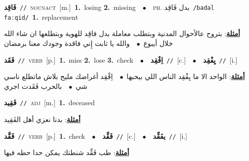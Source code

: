 \documentclass[10pt,a4paper,twoside]{article} %
\begin{document}
\begin{multicols}{2}
{\setlength\topsep{0pt}\textbf{\foreignlanguage{arabic}{فَاقِد}}\ {\color{gray}\texttt{//}\color{black}}\ \textsc{noun\textunderscore act}\ [m.]\ \textbf{1.}~losing  \textbf{2.}~missing\ \ $\bullet$\ \ \textsc{ph.} \color{gray} \foreignlanguage{arabic}{بدل فَاقِد}\color{black}\ {\color{gray}\texttt{/{\sffamily badal faːqid}/}\color{black}}\ \textbf{1.}~replacement\  \begin{flushright}\color{gray}\foreignlanguage{arabic}{\textbf{\underline{\foreignlanguage{arabic}{أمثلة}}}: بتروح عالأحوال المدنية وبتطلب معاملة بدل فاقِد للهوية وبتطلعها ان شاء الله خلال أيبوع\ $\bullet$\ \  والله يا ثابت إِني فاقدة وجودك معنا برمضان}\end{flushright}\color{black}} \vspace{2mm}

{\setlength\topsep{0pt}\textbf{\foreignlanguage{arabic}{فَقَد}}\ {\color{gray}\texttt{//}\color{black}}\ \textsc{verb}\ [p.]\ \textbf{1.}~miss  \textbf{2.}~lose  \textbf{3.}~check\ \ $\bullet$\ \ \setlength\topsep{0pt}\textbf{\foreignlanguage{arabic}{اِفْقِد}}\ {\color{gray}\texttt{//}\color{black}}\ [c.]\ \ $\bullet$\ \ \setlength\topsep{0pt}\textbf{\foreignlanguage{arabic}{يِفْقِد}}\ {\color{gray}\texttt{//}\color{black}}\ [i.]\  \begin{flushright}\color{gray}\foreignlanguage{arabic}{\textbf{\underline{\foreignlanguage{arabic}{أمثلة}}}: الواحد الا ما يِفْقِد الناس اللي بيحبها\ $\bullet$\ \  اِفْقِد أغراضك مليح بلاش ماتطلع ناسي شي\ $\bullet$\ \  بالحرب فَقَدت اجري}\end{flushright}\color{black}} \vspace{2mm}

{\setlength\topsep{0pt}\textbf{\foreignlanguage{arabic}{فَقِيد}}\ {\color{gray}\texttt{//}\color{black}}\ \textsc{adj}\ [m.]\ \textbf{1.}~deceased\  \begin{flushright}\color{gray}\foreignlanguage{arabic}{\textbf{\underline{\foreignlanguage{arabic}{أمثلة}}}: بدنا نعزي أهل الفَقِيد}\end{flushright}\color{black}} \vspace{2mm}

{\setlength\topsep{0pt}\textbf{\foreignlanguage{arabic}{فَقَّد}}\ {\color{gray}\texttt{//}\color{black}}\ \textsc{verb}\ [p.]\ \textbf{1.}~check\ \ $\bullet$\ \ \setlength\topsep{0pt}\textbf{\foreignlanguage{arabic}{فَقِّد}}\ {\color{gray}\texttt{//}\color{black}}\ [c.]\ \ $\bullet$\ \ \setlength\topsep{0pt}\textbf{\foreignlanguage{arabic}{يفَقِّد}}\ {\color{gray}\texttt{//}\color{black}}\ [i.]\  \begin{flushright}\color{gray}\foreignlanguage{arabic}{\textbf{\underline{\foreignlanguage{arabic}{أمثلة}}}: طب فَقِّد شنطتك يمكن حدا حطه فيها}\end{flushright}\color{black}} \vspace{2mm}


\end{multicols}
\end{document}
